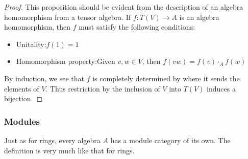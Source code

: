 \documentclass[../thesis.tex]{subfiles}
\begin{document}
            \begin{proof}
                This proposition should be evident from the description of an algebra homomorphism from a tensor algebra. If $f: T(V) \rightarrow A$ is an algebra homomorphism, then $f$ must satisfy the following conditions:
                \begin{itemize}
                    \item Unitality:\quad $f(1) = 1$
                    \item Homomorphism property:\quad Given $v,w\in V$, then $f(vw) = f(v)\cdot_Af(w)$
                \end{itemize}
                By induction, we see that $f$ is completely determined by where it sends the elements of $V$. Thus restriction by the inclusion of $V$ into $T(V)$ induces a bijection.
            \end{proof}

            \subsubsection*{Modules}

                Just as for rings, every algebra $A$ has a module category of its own. The definition is very much like that for rings.
\end{document}
